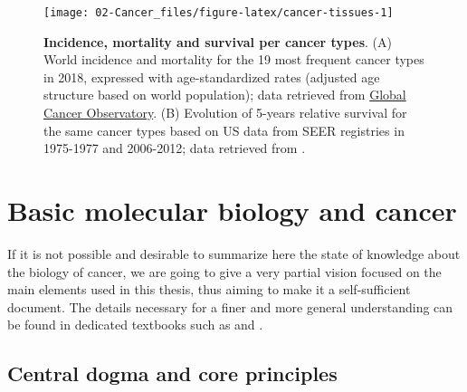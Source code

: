 \documentclass[a4paper,12pt,twoside,onecolumn,openright,final,oldfontcommands]{memoir}
\begin{document}
\begin{figure}

{\centering \texttt{[image: 02-Cancer\_files/figure-latex/cancer-tissues-1]} 

}

\caption[Incidence, mortality and survival per cancer types]{\textbf{Incidence, mortality and survival
per cancer types}. (A) World incidence and mortality for the 19 most
frequent cancer types in 2018, expressed with age-standardized rates
(adjusted age structure based on world population); data retrieved from
\href{https://gco.iarc.fr/today/home}{Global Cancer Observatory}. (B)
Evolution of 5-years relative survival for the same cancer types based
on US data from SEER registries in 1975-1977 and 2006-2012; data
retrieved from \citet{jemal2017annual}.}\label{fig:cancer-tissues}
\end{figure}










\section{Basic molecular biology and cancer}\label{molecular-biology}

If it is not possible and desirable to summarize here the state of
knowledge about the biology of cancer, we are going to give a very
partial vision focused on the main elements used in this thesis, thus
aiming to make it a self-sufficient document. The details necessary for
a finer and more general understanding can be found in dedicated
textbooks such as \citet{alberts2007molecular} and
\citet{weinberg2013biology}.

\subsection{Central dogma and core
principles}\label{central-dogma-and-core-principles}
\end{document}
